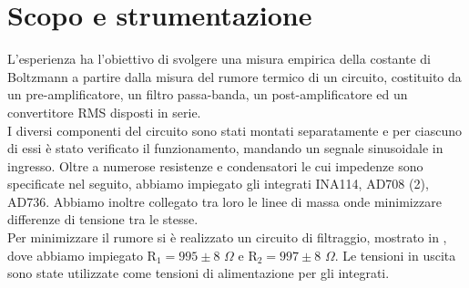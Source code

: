 \section{Scopo e strumentazione}
L'esperienza ha l'obiettivo di svolgere una misura empirica della costante di Boltzmann a partire dalla misura del rumore termico di un circuito, costituito da un pre-amplificatore, un filtro passa-banda, un post-amplificatore ed un convertitore RMS disposti in serie.\\
I diversi componenti del circuito sono stati montati separatamente e per ciascuno di essi è stato verificato il funzionamento, mandando un segnale sinusoidale in ingresso. Oltre a numerose resistenze e condensatori le cui impedenze sono specificate nel seguito, abbiamo impiegato gli integrati INA114, AD708 (2), AD736. Abbiamo inoltre collegato tra loro le linee di massa onde minimizzare differenze di tensione tra le stesse.\\
Per minimizzare il rumore si è realizzato un circuito di filtraggio, mostrato in , dove abbiamo impiegato R$_1 = 995 \pm 8$ $\Omega$ e R$_2 = 997 \pm 8$ $\Omega$. Le tensioni in uscita sono state utilizzate come tensioni di alimentazione per gli integrati.

